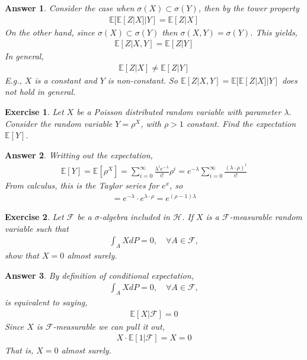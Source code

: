 \documentclass[12pt]{article}
\theoremstyle{colon}
\newtheorem{exercise}{Exercise}
\newtheorem*{answer}{Answer}
\begin{document}
\begin{answer}
  Consider the case when $\sigma(X) \subset \sigma(Y)$, then by the tower property
  \begin{gather*}
    \mathbb{E}[\mathbb{E}[Z | X] | Y] = \mathbb{E}[Z|X]
  \end{gather*}
  On the other hand, since $\sigma(X) \subset \sigma(Y)$ then $\sigma(X,Y) = \sigma(Y)$. This yields,
  \begin{gather*}
    \mathbb{E}[Z | X,Y] = \mathbb{E}[Z|Y]
  \end{gather*}
  In general,
  \begin{gather*}
    \mathbb{E}[Z|X] \neq \mathbb{E}[Z|Y]
  \end{gather*}
  E.g., $X$ is a constant and $Y$ is non-constant. So $\mathbb{E}[Z | X,Y] = \mathbb{E}[\mathbb{E}[Z | X] | Y]$ does not hold in general.
\end{answer}

\clearpage

\begin{exercise}
  Let $X$ be a Poisson distributed random variable with parameter $\lambda$. Consider the random variable $Y = \rho^X$, with $\rho > 1$ constant. Find the expectation $\mathbb{E}[Y]$.
\end{exercise}

\begin{answer}
  Writting out the expectation,
  \begin{gather*}
    \mathbb{E}[Y] = \mathbb{E}[\rho^X] = \sum_{i=0}^\infty \frac{\lambda^i e^{-\lambda}}{i!} \rho^i = e^{-\lambda} \sum_{i=0}^\infty \frac{(\lambda \cdot \rho)^i}{i!}
  \end{gather*}
  From calculus, this is the Taylor series for $e^x$, so
  \begin{gather*}
    = e^{-\lambda} \cdot e^{\lambda \cdot \rho} = e^{(\rho-1)\lambda}
  \end{gather*}
\end{answer}

\clearpage

\begin{exercise}
  Let $\mathcal{F}$ be a $\sigma$-algebra included in $\mathcal{H}$. If $X$ is a $\mathcal{F}$-measurable random variable such that
  \begin{gather*}
    \int_A X dP = 0, \quad \forall A \in \mathcal{F},
  \end{gather*}
  show that $X = 0$ almost surely.
\end{exercise}

\begin{answer}
  By definition of conditional expectation,
  \begin{gather*}
    \int_A X dP = 0, \quad \forall A \in \mathcal{F},
  \end{gather*}
  is equivalent to saying,
  \begin{gather*}
    \mathbb{E}[X | \mathcal{F}] = 0
  \end{gather*}
  Since $X$ is $\mathcal{F}$-measurable we can pull it out,
  \begin{gather*}
    X \cdot \mathbb{E}[1 | \mathcal{F}] = X = 0
  \end{gather*}
  That is, $X = 0$ almost surely.
\end{answer}
\end{document}
